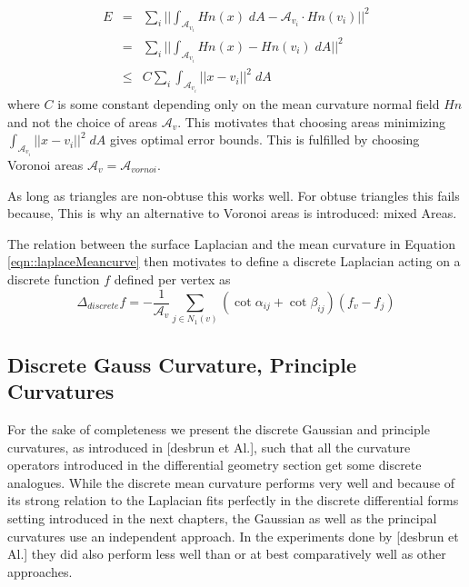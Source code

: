 \begin{eqnarray*}E &=& \sum_{i}||\int_{\mathcal A_{v_i}} Hn(x)\; dA - \mathcal A_{v_i} \cdot Hn(v_i)||^2 \\
&=&\sum_{i}||\int_{\mathcal A_{v_i}} Hn(x) - Hn(v_i)\; dA||^2 \\
&\leq & C \sum_{i}\int_{\mathcal A_{v_i}} ||x - v_i||^2\; dA
\end{eqnarray*}
where $C$ is some constant depending only on the mean curvature normal field $Hn$ and not the choice of areas $\mathcal A_v$. This motivates that choosing areas  minimizing $\int_{\mathcal A_{v_i}} ||x - v_i||^2\; dA$ gives optimal error bounds. This is fulfilled by choosing Voronoi areas $\mathcal  A_v = \mathcal A_{vornoi}$. 


As long as triangles are non-obtuse this works well. For obtuse triangles this fails because,  This is why an alternative to Voronoi areas is introduced: mixed Areas.


The relation between the surface Laplacian and the mean curvature in Equation \ref{eqn::laplaceMeancurve} then motivates to define a discrete Laplacian acting on a discrete function $f$ defined per vertex as
\[\Delta_{discrete} f = -\frac{1}{\mathcal A_v}\sum_{j\in N_1(v)} (\cot \alpha_{ij} + \cot \beta_{ij})(f_v-f_j)\] 

\subsection{Discrete Gauss Curvature, Principle Curvatures}
For the sake of completeness we present the discrete Gaussian and principle curvatures, as introduced in [desbrun et Al.], such that all the curvature operators introduced in the differential geometry section get some discrete analogues. While the discrete mean curvature performs very well and because of its strong relation to the Laplacian fits perfectly in the discrete differential forms setting introduced in the next chapters, the Gaussian as well as the principal curvatures use an independent approach. In the experiments done by [desbrun et Al.] they did also perform less well than or at best comparatively well as other approaches. 


